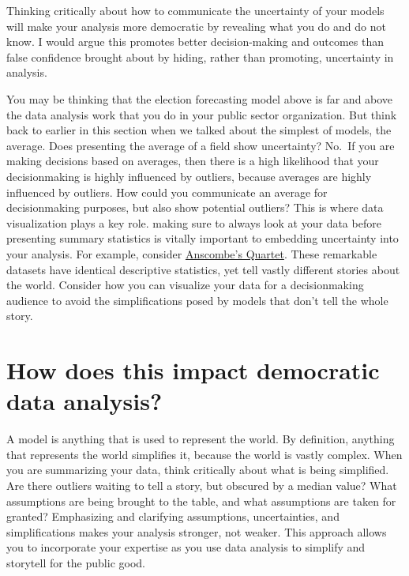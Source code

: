 \documentclass[
]{book}
\begin{document}
Thinking critically about how to communicate the uncertainty of your models will make your analysis more democratic by revealing what you do and do not know. I would argue this promotes better decision-making and outcomes than false confidence brought about by hiding, rather than promoting, uncertainty in analysis.

You may be thinking that the election forecasting model above is far and above the data analysis work that you do in your public sector organization. But think back to earlier in this section when we talked about the simplest of models, the average. Does presenting the average of a field show uncertainty? No.~If you are making decisions based on averages, then there is a high likelihood that your decisionmaking is highly influenced by outliers, because averages are highly influenced by outliers. How could you communicate an average for decisionmaking purposes, but also show potential outliers? This is where data visualization plays a key role. making sure to always look at your data before presenting summary statistics is vitally important to embedding uncertainty into your analysis. For example, consider \href{https://en.wikipedia.org/wiki/Anscombe's_quartet}{Anscombe's Quartet}. These remarkable datasets have identical descriptive statistics, yet tell vastly different stories about the world. Consider how you can visualize your data for a decisionmaking audience to avoid the simplifications posed by models that don't tell the whole story.

\hypertarget{how-does-this-impact-democratic-data-analysis}{%
\section{How does this impact democratic data analysis?}\label{how-does-this-impact-democratic-data-analysis}}

A model is anything that is used to represent the world. By definition, anything that represents the world simplifies it, because the world is vastly complex. When you are summarizing your data, think critically about what is being simplified. Are there outliers waiting to tell a story, but obscured by a median value? What assumptions are being brought to the table, and what assumptions are taken for granted? Emphasizing and clarifying assumptions, uncertainties, and simplifications makes your analysis stronger, not weaker. This approach allows you to incorporate your expertise as you use data analysis to simplify and storytell for the public good.
\end{document}
